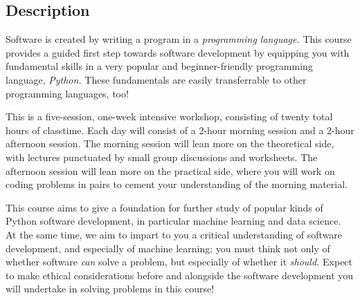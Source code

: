 \documentclass[11pt]{article}
\begin{document}
\begin{multicols}{2}
  \columnbreak
  \section*{Description}

  Software is created by writing a program in a \emph{programming language.} This course
  provides a guided first step towards software development by equipping you
  with fundamental skills in a very popular and beginner-friendly programming
  language, \emph{Python.} These fundamentals are easily transferrable to other
  programming languages, too!

  This is a five-session, one-week intensive workshop, consisting of twenty total
  hours of classtime. Each day will consist of a 2-hour morning session and a
  2-hour afternoon session. The morning session will lean more on the
  theoretical side, with lectures punctuated by small group discussions and
  worksheets. The afternoon session will lean more on the practical side, where
  you will work on coding problems in pairs to cement your understanding of the
  morning material.

  This course aims to give a foundation for further study of popular kinds of
  Python software development, in particular machine learning and data science.
  At the same time, we aim to impart to you a critical understanding of software
  development, and especially of machine learning: you must think not only of
  whether software \emph{can} solve a problem, but especially of whether it
  \emph{should.} Expect to make ethical considerations before and alongside the
  software development you will undertake in solving problems in this course!
\end{multicols}
\end{document}
